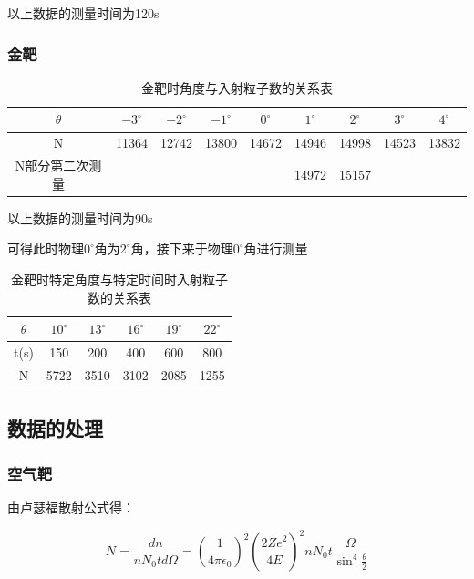 \documentclass[a4paper,UTF8]{ctexart}
\begin{document}
以上数据的测量时间为120s

\subsubsection{金靶}

\begin{table}[H]
    \centering
    \begin{tabular}{|c|c|c|c|c|c|c|c|c|}
    \hline
        $\theta$ & $-3 ^\circ$ & $-2 ^\circ$ & $-1 ^\circ$ & $0^\circ$ & $1 ^\circ$ & $2 ^\circ$ & $3 ^\circ$ & $4^\circ$ \\ \hline
        N & 11364 & 12742 & 13800 & 14672 & 14946 & 14998 & 14523 & 13832 \\ 
        N部分第二次测量 & ~ & ~ & ~ & ~ & 14972 & 15157 & ~ & ~ \\ \hline
    \end{tabular}
    \caption{金靶时角度与入射粒子数的关系表}
\end{table}

以上数据的测量时间为90s

可得此时物理$0^\circ$角为$2^\circ$角，接下来于物理$0^\circ$角进行测量

\begin{table}[H]
    \centering
    \begin{tabular}{|c|c|c|c|c|c|}
    \hline
        $\theta$ & $10^\circ$ & $13^\circ$ & $16^\circ$ & $19^\circ$ & $22^\circ$ \\ \hline
        t(s) & 150 & 200 & 400 & 600 & 800 \\ \hline
        N & 5722 & 3510 & 3102 & 2085 & 1255 \\ \hline
    \end{tabular}
    \caption{金靶时特定角度与特定时间时入射粒子数的关系表}
\end{table}

\subsection{数据的处理}

\subsubsection{空气靶}

由卢瑟福散射公式得：

\begin{equation}
    N = \frac{dn}{nN_{0}td\Omega} = (\frac{1}{4\pi \epsilon_{0}})^2 (\frac{2Ze^2}{4E})^2 nN_0t \frac{\Omega}{\sin^4{\frac{\theta}{2}}}
\end{equation}
\end{document}
